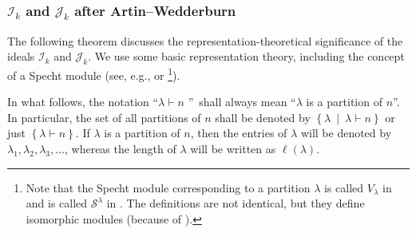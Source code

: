 \documentclass[numbers=enddot,12pt,final,onecolumn,notitlepage]{scrartcl}%
\numberwithin{exer}{subsection}
\theoremstyle{definition}
\begin{document}
\subsubsection{$\mathcal{I}_{k}$ and $\mathcal{J}_{k}$ after
Artin--Wedderburn}

The following theorem discusses the representation-theoretical significance of
the ideals $\mathcal{I}_{k}$ and $\mathcal{J}_{k}$. We use some basic
representation theory, including the concept of a Specht module (see, e.g.,
\cite[\S 5.12]{Etingof} or \cite[Definition 5.11.1 \textbf{(a)}]%
{sga}\footnote{Note that the Specht module corresponding to a partition
$\lambda$ is called $V_{\lambda}$ in \cite[\S 5.12]{Etingof} and is called
$\mathcal{S}^{\lambda}$ in \cite[Definition 5.11.1 \textbf{(a)}]{sga}. The
definitions are not identical, but they define isomorphic modules (because of
\cite[Theorem 5.5.13 \textbf{(b)}]{sga}).}).

In what follows, the notation \textquotedblleft$\lambda\vdash n$%
\textquotedblright\ shall always mean \textquotedblleft$\lambda$ is a
partition of $n$\textquotedblright. In particular, the set of all partitions
of $n$ shall be denoted by $\left\{  \lambda\ \mid\ \lambda\vdash n\right\}  $
or just $\left\{  \lambda\vdash n\right\}  $. If $\lambda$ is a partition of
$n$, then the entries of $\lambda$ will be denoted by $\lambda_{1},\lambda
_{2},\lambda_{3},\ldots$, whereas the length of $\lambda$ will be written as
$\ell\left(  \lambda\right)  $.
\end{document}
